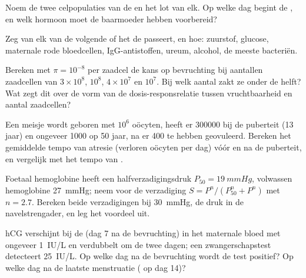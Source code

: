 \begin{exercise}[$\star$]\label{exo:b2:mammal-reproduction:3}
Noem de twee celpopulaties van de  en het lot van elk. Op welke
dag begint de , en welk hormoon moet de baarmoeder hebben
voorbereid?
\end{exercise}

\begin{exercise}[$\star$]\label{exo:b2:mammal-reproduction:4}
Zeg van elk van de volgende of het de  passeert, en hoe: zuurstof,
glucose, maternale rode bloedcellen, IgG-antistoffen, ureum, alcohol, de
meeste bacteriën.
\end{exercise}

\begin{exercise}[$\star\star$]\label{exo:b2:mammal-reproduction:5}
Bereken met $\pi = 10^{-8}$ per zaadcel de kans op bevruchting bij
aantallen zaadcellen van $3\times 10^{8}$, $10^{8}$,
$4\times 10^{7}$ en $10^{7}$. Bij welk aantal zakt ze onder de helft? Wat
zegt dit over de vorm van de dosis-responsrelatie tussen vruchtbaarheid en
aantal zaadcellen?
\end{exercise}

\begin{exercise}[$\star\star$]\label{exo:b2:mammal-reproduction:6}
Een meisje wordt geboren met $10^{6}$ oöcyten, heeft er \num{300000} bij
de puberteit (13 jaar) en ongeveer \num{1000} op 50 jaar, na er \num{400}
te hebben geovuleerd. Bereken het gemiddelde tempo van atresie (verloren
oöcyten per dag) vóór en na de puberteit, en vergelijk met het tempo van
.
\end{exercise}

\begin{exercise}[$\star\star$]\label{exo:b2:mammal-reproduction:7}
Foetaal hemoglobine heeft een halfverzadigingsdruk $P_{50} =
\qty{19}{mmHg}$, volwassen hemoglobine \qty{27}{mmHg}; neem voor de
verzadiging $S = P^{n}/(P_{50}^{n} + P^{n})$ met $n = 2.7$.
Bereken beide verzadigingen bij \qty{30}{mmHg}, de druk in de
navelstrengader, en leg het voordeel uit.
\end{exercise}

\begin{exercise}[$\star\star$]\label{exo:b2:mammal-reproduction:8}
hCG verschijnt bij de  (dag 7 na de bevruchting) in het
maternale bloed met ongeveer \qty{1}{IU/L} en verdubbelt om de twee dagen;
een zwangerschapstest detecteert \qty{25}{IU/L}. Op welke dag na de
bevruchting wordt de test positief? Op welke dag na de laatste menstruatie
( op dag 14)?
\end{exercise}

